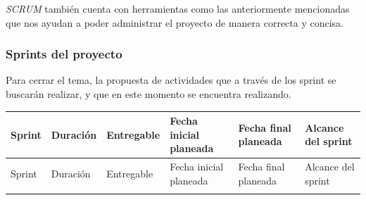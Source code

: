 \documentclass[10pt]{article}
\begin{document}
\textit{SCRUM} también cuenta con herramientas como las anteriormente mencionadas que nos ayudan a poder administrar el proyecto de manera correcta y concisa.

\subsubsection{Sprints del proyecto}
Para cerrar el tema, la propuesta de actividades que a través de los sprint se buscarán realizar, y que en este momento se encuentra realizando.

\begin{longtable}{|p{0.8cm}|p{1.8cm}|p{4.0cm}|p{2.3cm}|p{2.3cm}|p{2.5cm}|}
\hline
Sprint & Duración & Entregable &Fecha inicial planeada & Fecha final planeada & Alcance del sprint \\
\hline 
\endfirsthead

\hline

Sprint & Duración & Entregable &Fecha inicial planeada & Fecha final planeada & Alcance del sprint \\
\hline 
\endhead

\multicolumn{6}{c}{}
\endfoot


\end{longtable}
\end{document}

